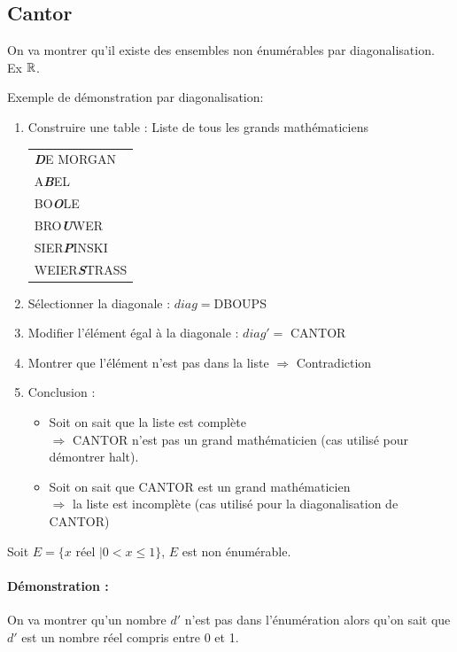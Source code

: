 \subsection{Cantor}
\label{sub:cantor}
On va montrer qu'il existe des ensembles non énumérables par diagonalisation. Ex $\mathbb{R}$.
\begin{myexem}
	Exemple de démonstration par diagonalisation: 
	\begin{enumerate}
		\item Construire une table : Liste de tous les grands
			mathématiciens \\	
			\begin{tabular}{l}
				\textit{\textbf{D}}E MORGAN \\
				A\textit{\textbf{B}}EL\\
				BO\textit{\textbf{O}}LE\\
				BRO\textit{\textbf{U}}WER\\
				SIER\textit{\textbf{P}}INSKI\\
				WEIER\textit{\textbf{S}}TRASS\\
			\end{tabular}
		\item Sélectionner la diagonale : $diag = $DBOUPS
		\item Modifier l'élément égal à la diagonale : $diag' =$ CANTOR
		\item Montrer que l'élément n'est pas dans la liste $\Rightarrow$ Contradiction
		\item Conclusion :
			\begin{itemize}
				\item Soit on sait que la liste est complète\\
					$ \Rightarrow$ CANTOR n'est pas un grand
				mathématicien (cas utilisé pour démontrer
				halt).
				\item Soit on sait que CANTOR est un grand
					mathématicien \\
					$ \Rightarrow$ la liste est incomplète
				(cas utilisé pour la diagonalisation de CANTOR)
			\end{itemize}
	\end{enumerate}
\end{myexem}

\begin{mytheo}
	Soit $E = \{ x \text{ réel }| 0<x\leq1\}$, $E$ est non énumérable.
\end{mytheo}

\paragraph{Démonstration :}
On va montrer qu'un nombre $d'$ n'est pas dans l'énumération alors qu'on sait
que $d'$ est un nombre réel compris entre 0 et 1.

